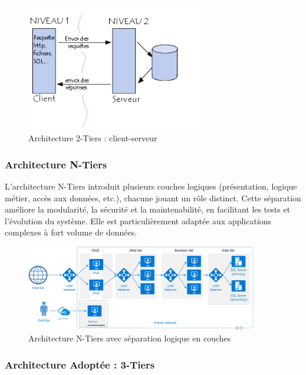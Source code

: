 \begin{figure}[H]
    \centering
    \includegraphics[height=0.4\textheight, width=0.7\textwidth]{figures/2-tier.png}
    \caption{Architecture 2-Tiers : client-serveur}
\end{figure}

\subsubsection{Architecture N-Tiers}

L'architecture N-Tiers introduit plusieurs couches logiques (présentation, logique métier, accès aux données, etc.), chacune jouant un rôle distinct. Cette séparation améliore la modularité, la sécurité et la maintenabilité, en facilitant les tests et l’évolution du système. Elle est particulièrement adaptée aux applications complexes à fort volume de données.

\begin{figure}[H]
    \centering
    \includegraphics[height=0.4\textheight, width=0.9\textwidth]{figures/n-tier-arch.png}
    \caption{Architecture N-Tiers avec séparation logique en couches}
\end{figure}

\subsubsection{Architecture Adoptée : 3-Tiers}

